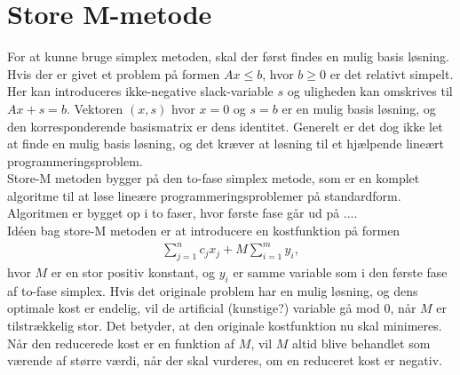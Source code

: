 \section{Store M-metode}

For at kunne bruge simplex metoden, skal der først findes en mulig basis løsning. 
Hvis der er givet et problem på formen $Ax \leq b$, hvor $b \geq 0$ er det relativt simpelt. 
Her kan introduceres ikke-negative slack-variable $s$ og uligheden kan omskrives til $Ax+s=b$. 
Vektoren $(x,s)$ hvor $x=0$ og $s=b$ er en mulig basis løsning, og den korresponderende basismatrix er dens identitet. 
Generelt er det dog ikke let at finde en mulig basis løsning, og det kræver at løsning til et hjælpende lineært programmeringsproblem. \\

Store-M metoden bygger på den to-fase simplex metode, som er en komplet algoritme til at løse lineære programmeringsproblemer på standardform. 
Algoritmen er bygget op i to faser, hvor første fase går ud på .... \\

Idéen bag store-M metoden er at introducere en kostfunktion på formen
\begin{align*}
\sum\limits_{j=1}^n c_jx_j + M \sum\limits_{i=1}^m y_i,
\end{align*}
hvor $M$ er en stor positiv konstant, og $y_i$ er samme variable som i den første fase af to-fase simplex. 
Hvis det originale problem har en mulig løsning, og dens optimale kost er endelig, vil de artificial (kunstige?) variable gå mod $0$, når $M$ er tilstrækkelig stor. 
Det betyder, at den originale kostfunktion nu skal minimeres. 
Når den reducerede kost er en funktion af $M$, vil $M$ altid blive behandlet som værende af større værdi, når der skal vurderes, om en reduceret kost er negativ. \\

